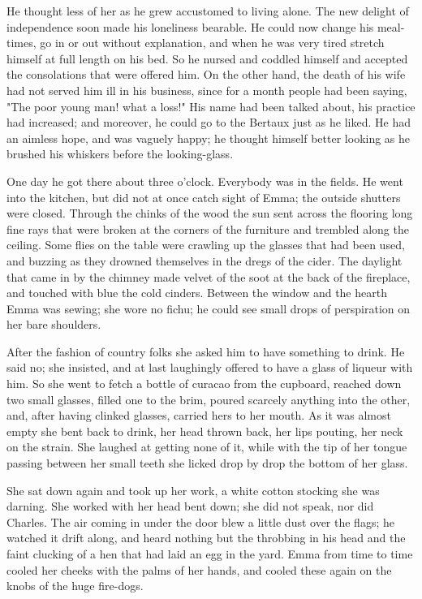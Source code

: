 \documentclass{tufte-book}
\begin{document}
He thought less of her as he grew accustomed to living alone. The new
delight of independence soon made his loneliness bearable. He could now
change his meal-times, go in or out without explanation, and when he was
very tired stretch himself at full length on his bed. So he nursed and
coddled himself and accepted the consolations that were offered him.
On the other hand, the death of his wife had not served him ill in his
business, since for a month people had been saying, "The poor young
man! what a loss!" His name had been talked about, his practice had
increased; and moreover, he could go to the Bertaux just as he liked.
He had an aimless hope, and was vaguely happy; he thought himself better
looking as he brushed his whiskers before the looking-glass.

One day he got there about three o'clock. Everybody was in the fields.
He went into the kitchen, but did not at once catch sight of Emma; the
outside shutters were closed. Through the chinks of the wood the sun
sent across the flooring long fine rays that were broken at the corners
of the furniture and trembled along the ceiling. Some flies on the table
were crawling up the glasses that had been used, and buzzing as they
drowned themselves in the dregs of the cider. The daylight that came in
by the chimney made velvet of the soot at the back of the fireplace, and
touched with blue the cold cinders. Between the window and the hearth
Emma was sewing; she wore no fichu; he could see small drops of
perspiration on her bare shoulders.

After the fashion of country folks she asked him to have something to
drink. He said no; she insisted, and at last laughingly offered to have
a glass of liqueur with him. So she went to fetch a bottle of curacao
from the cupboard, reached down two small glasses, filled one to the
brim, poured scarcely anything into the other, and, after having clinked
glasses, carried hers to her mouth. As it was almost empty she bent
back to drink, her head thrown back, her lips pouting, her neck on the
strain. She laughed at getting none of it, while with the tip of her
tongue passing between her small teeth she licked drop by drop the
bottom of her glass.

She sat down again and took up her work, a white cotton stocking she was
darning. She worked with her head bent down; she did not speak, nor did
Charles. The air coming in under the door blew a little dust over the
flags; he watched it drift along, and heard nothing but the throbbing
in his head and the faint clucking of a hen that had laid an egg in the
yard. Emma from time to time cooled her cheeks with the palms of her
hands, and cooled these again on the knobs of the huge fire-dogs.
\end{document}
